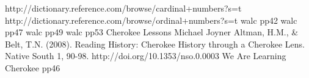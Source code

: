 

\begin{thebibliography}{99}
 http://dictionary.reference.com/browse/cardinal+numbers?s=t
 http://dictionary.reference.com/browse/ordinal+numbers?s=t
 walc pp42
 walc pp47
 walc pp49
 walc pp53
 Cherokee Lessons Michael Joyner
 Altman, H.M., \& Belt, T.N. (2008). Reading History: Cherokee History through a Cherokee Lens. Native South 1, 90-98. http://doi.org/10.1353/nso.0.0003
 We Are Learning Cherokee pp46
\end{thebibliography}
